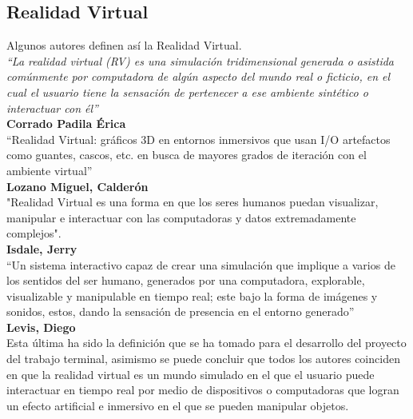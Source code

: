 \subsection{Realidad Virtual}
Algunos autores definen así la Realidad Virtual.\\
\newline
\textit{“La realidad virtual (RV) es una simulación tridimensional generada o asistida comúnmente por computadora de algún aspecto del mundo real o ficticio, en el cual 
el usuario tiene la sensación de pertenecer a ese ambiente sintético o interactuar con él”}\cite{web6}\\ 
\textbf{Corrado Padila Érica}\\
\newline
“Realidad Virtual: gráficos 3D en entornos inmersivos que usan I/O
artefactos como guantes, cascos, etc. en busca de mayores grados de iteración
con el ambiente virtual”\cite{web7}\\ 
\textbf{Lozano Miguel, Calderón}\\
\newline
"Realidad Virtual es una forma en que los seres humanos puedan
visualizar, manipular e interactuar con las computadoras y datos extremadamente
complejos".\cite{web8}\\
\textbf{Isdale, Jerry}\\
\newline
“Un sistema interactivo capaz de crear una simulación que implique a varios de los sentidos del ser humano, generados por una computadora, explorable, visualizable y manipulable 
en tiempo real; este bajo la forma de imágenes y sonidos, estos, dando la sensación de presencia en el entorno generado”\cite{web9}\\
\textbf{Levis, Diego}\\
\newline
Esta última ha sido la definición que se ha tomado para el desarrollo del proyecto del trabajo terminal, asimismo se puede concluir que todos los autores coinciden en que la 
realidad virtual es un mundo simulado en el que el usuario puede interactuar en tiempo real por medio
de dispositivos o computadoras que logran un efecto artificial e inmersivo en el que se pueden manipular objetos.


